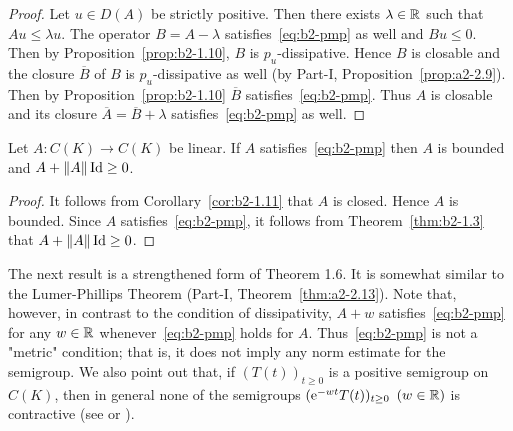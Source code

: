 \begin{proof}%
Let $u \in D(A)$ be strictly positive.
Then there exists $\lambda \in \mathbb{R}$ such that $Au \leq \lambda u$.
The operator $B = A - \lambda$ satisfies~\eqref{eq:b2-pmp} as well and $Bu \leq 0$.
Then by Proposition~\ref{prop:b2-1.10}, $B$ is $p_{u}$-dissipative.
Hence $B$ is closable and the closure $\overline{B}$ of\/ $B$ is $p_{u}$-dissipative as well (by Part-I, Proposition~\ref{prop:a2-2.9}).
Then by Proposition~\ref{prop:b2-1.10} $\overline{B}$ satisfies~\eqref{eq:b2-pmp}.
Thus $A$ is closable and its closure $\overline{A} = \overline{B} + \lambda$ satisfies~\eqref{eq:b2-pmp} as well.
\end{proof}
\begin{corollary}\label{cor:b2-1.12}
Let $A \colon C(K) \to C(K)$ be linear.
If\/ $A$ satisfies~\eqref{eq:b2-pmp} then $A$ is bounded and $A + \|A\|\Id \geq 0$.
\end{corollary}
\begin{proof}
It follows from Corollary~\ref{cor:b2-1.11} that $A$ is closed.
Hence $A$ is bounded.
Since $A$ satisfies~\eqref{eq:b2-pmp}, it follows from Theorem~\ref{thm:b2-1.3} that $A + \|A\|\Id \geq 0$.
\end{proof}
The next result is a strengthened form of Theorem 1.6.
It is somewhat similar to the Lumer-Phillips Theorem (Part-I, Theorem~\ref{thm:a2-2.13}).
Note that, however, in contrast to the condition of dissipativity, $A + w$ satisfies~\eqref{eq:b2-pmp} for any $w \in \mathbb{R}$ whenever~\eqref{eq:b2-pmp} holds for $A$.
Thus~\eqref{eq:b2-pmp} is not a "metric" condition; that is, it does not imply any norm estimate for the semigroup.
We also point out that, if\/ $(T(t))_{t \geq 0}$ is a positive semigroup on $C(K)$, then in general none of the semigroups $(\eu^{-wt}T(t))_{t \geq 0}$ $(w \in \mathbb{R})$ is contractive (see \textcite{battydavies:1983} or \textcite{derndinger:1983}).

